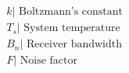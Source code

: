 \documentclass[preview]{standalone}
\begin{document}
\begin{align*}
&k \text{| Boltzmann's constant} \\ &T_s \text{| System temperature} \\ &B_n \text{| Receiver bandwidth} \\ &F \text{| Noise factor}
\end{align*}
\end{document}
